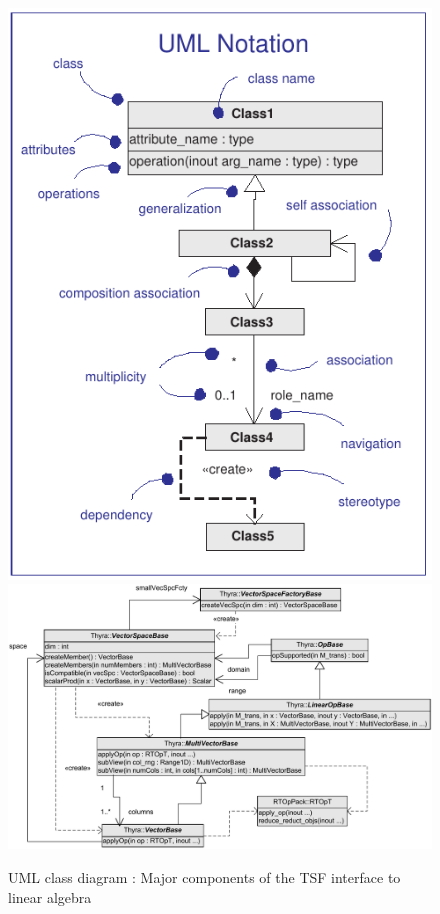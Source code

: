 \documentclass[pdf,ps2pdf,11pt]{SANDreport}
\begin{document}
{\bsinglespace
\begin{figure}[t]
\begin{center}
\includegraphics*[bb= 0.0in 0.0in 3.3in 4.4in,scale=0.40
]{figures/UML1}
\includegraphics*[scale=0.65]{figures/ThyraOperatorVector}
\end{center}
\caption{
\label{thyra:fig:basic_op_vec_itfc}
UML class diagram : Major components of the TSF
interface to linear algebra
}
\end{figure}
\esinglespace}
\end{document}
